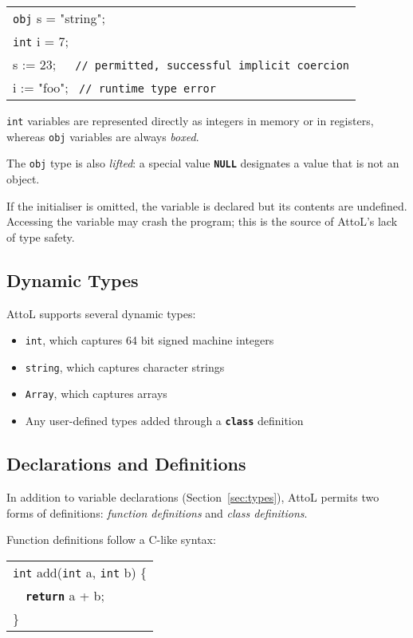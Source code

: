 \documentclass[11pt,a4paper]{article}
\newenvironment{slisting}{%
        \begin{tt}%
        \begin{tabular}{l}%
        }
        {%
        \end{tabular}%
        \end{tt}%
        }
\newcommand{\Cty}[1]{\textcolor{dblue}{\texttt{#1}}}
\newcommand{\Ccom}[1]{\textcolor{dgreen}{\texttt{#1}}}
\newcommand{\Ckw}[1]{\textbf{\texttt{#1}}}
\begin{document}
\begin{slisting}
\Cty{obj} s = "string";\\
\Cty{int} i = 7;\\
s := 23;\ \ \  \Ccom{// permitted, successful implicit coercion}\\
i := "foo"; \ \Ccom{// runtime type error}\\
\end{slisting}

\Cty{int} variables are represented directly as integers in memory or
in registers, whereas \Cty{obj} variables are always \emph{boxed}.

The \Cty{obj} type is also \emph{lifted}: a special value \Ckw{NULL}
designates a value that is not an object.

If the initialiser is omitted, the variable is declared but its
contents are undefined.  Accessing the variable may crash the program;
this is the source of AttoL's lack of type safety.

\subsection{Dynamic Types}
AttoL supports several dynamic types:
\begin{itemize}
\item \Cty{int}, which captures 64 bit signed machine integers
\item \Cty{string}, which captures character strings
\item \Cty{Array}, which captures arrays
\item Any user-defined types added through a \Ckw{class} definition
\end{itemize}

\subsection{Declarations and Definitions}\label{sec:decl}
In addition to variable declarations (Section~\ref{sec:types}), AttoL permits two forms of definitions:
\emph{function definitions} and \emph{class definitions}.  

Function definitions follow a C-like syntax:

\begin{slisting}
\Cty{int} add(\Cty{int} a, \Cty{int} b) \{\\
\ \ \Ckw{return} a + b;\\
\}\\
\end{slisting}
\end{document}
